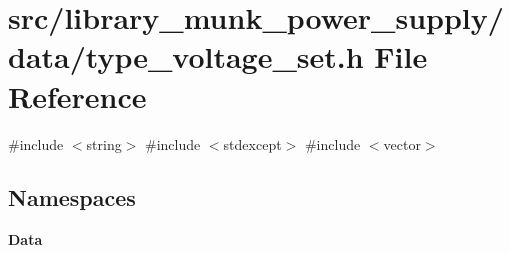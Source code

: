\section{src/library\+\_\+munk\+\_\+power\+\_\+supply/data/type\+\_\+voltage\+\_\+set.h File Reference}
\label{type__voltage__set_8h}
{\ttfamily \#include $<$string$>$}\newline
{\ttfamily \#include $<$stdexcept$>$}\newline
{\ttfamily \#include $<$vector$>$}\newline
\subsection*{Namespaces}
\begin{DoxyCompactItemize}
\item 
 \textbf{ Data}
\end{DoxyCompactItemize}
